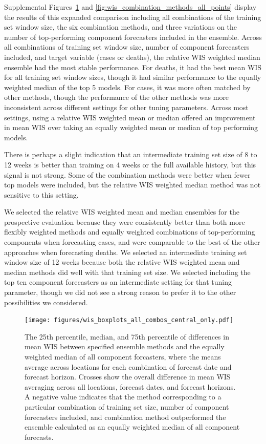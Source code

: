 \documentclass{article}
\begin{document}
Supplemental Figures~\ref{fig:wis_combination_methods_central_only} and \ref{fig:wis_combination_methods_all_points} display the results of this expanded comparison including all combinations of the training set window size, the six combination methods, and three variations on the number of top-performing component forecasters included in the ensemble. Across all combinations of training set window size, number of component forecasters included, and target variable (cases or deaths), the relative WIS weighted median ensemble had the most stable performance. For deaths, it had the best mean WIS for all training set window sizes, though it had similar performance to the equally weighted median of the top 5 models. For cases, it was more often matched by other methods, though the performance of the other methods was more inconsistent across different settings for other tuning parameters. Across most settings, using a relative WIS weighted mean or median offered an improvement in mean WIS over taking an equally weighted mean or median of top performing models.

There is perhaps a slight indication that an intermediate training set size of 8 to 12 weeks is better than training on 4 weeks or the full available history, but this signal is not strong. Some of the combination methods were better when fewer top models were included, but the relative WIS weighted median method was not sensitive to this setting.

We selected the relative WIS weighted mean and median ensembles for the prospective evaluation because they were consistently better than both more flexibly weighted methods and equally weighted combinations of top-performing components when forecasting cases, and were comparable to the best of the other approaches when forecasting deaths. We selected an intermediate training set window size of 12 weeks because both the relative WIS weighted mean and median methods did well with that training set size. We selected including the top ten component forecasters as an intermediate setting for that tuning parameter, though we did not see a strong reason to prefer it to the other possibilities we considered.

\newpage

\begin{figure}[H]
  \texttt{[image: figures/wis\_boxplots\_all\_combos\_central\_only.pdf]}
  \caption{The 25th percentile, median, and 75th percentile of differences in mean WIS between specified ensemble methods and the equally weighted median of all component forcasters, where the means average across locations for each combination of forecast date and forecast horizon. Crosses show the overall difference in mean WIS averaging across all locations, forecast dates, and forecast horizons.
  A negative value indicates that the method corresponding to a particular combination of training set size, number of component forecasters included, and combination method outperformed the ensemble calculated as an equally weighted median of all component forecasts.}
  \label{fig:wis_combination_methods_central_only}
\end{figure}
\end{document}
